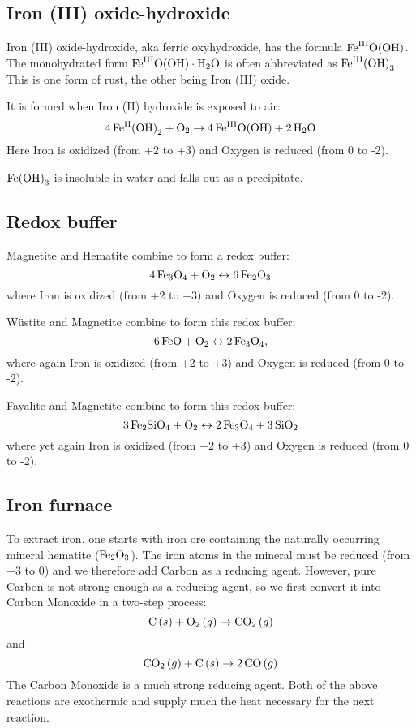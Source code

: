 \documentclass[a4paper,14pt]{extarticle}
\def\H{{\rm H}}
\def\O{{\rm O}}
\def\C{{\rm C}}
\def\Fe{{\rm Fe}}
\def\Si{{\rm Si}}
\def\II{{\rm II}}
\def\III{{\rm III}}
\begin{document}
\subsection{Iron (III) oxide-hydroxide}
Iron (III) oxide-hydroxide, aka ferric oxyhydroxide, has the formula $\Fe^\III\O(\O\H)$. The monohydrated form
$\Fe^\III\O(\O\H)\cdot \H_2\O$ is often abbreviated as $\Fe^\III{(\O\H)}_3$. This is one form of rust, the other being
Iron (III) oxide.

It is formed when Iron (II) hydroxide is exposed to air:
\[
    4 \,\Fe^\II{(\O\H)}_2 + \O_2 \rightarrow 4 \,\Fe^\III\O(\O\H) + 2 \,\H_2\O
\]
Here Iron is oxidized (from +2 to +3) and Oxygen is reduced (from 0 to -2).

$\Fe{(\O\H)}_3$ is insoluble in water and falls out as a precipitate.

\subsection{Redox buffer}
Magnetite and Hematite combine to form a redox buffer:
\[
    4 \,\Fe_3\O_4 + \O_2 \leftrightarrow 6\, \Fe_2\O_3
\]
where Iron is oxidized (from +2 to +3) and Oxygen is reduced (from 0 to -2).

Wüstite and Magnetite combine to form this redox buffer:
\[
    6 \,\Fe\O + \O_2 \leftrightarrow 2\,\Fe_3\O_4,
\]
where again Iron is oxidized (from +2 to +3) and Oxygen is reduced (from 0 to -2).

Fayalite and Magnetite combine to form this redox buffer:
\[
    3 \,\Fe_2\Si\O_4 + \O_2 \leftrightarrow 2 \,\Fe_3\O_4 + 3 \,\Si\O_2
\]
where yet again Iron is oxidized (from +2 to +3) and Oxygen is reduced (from 0 to -2).

\subsection{Iron furnace}
To extract iron, one starts with iron ore containing the naturally occurring mineral hematite ($\Fe_2\O_3$). The iron
atoms in the mineral must be reduced (from +3 to 0) and we therefore add Carbon as a reducing agent. However, pure Carbon is not
strong enough as a reducing agent, so we first convert it into Carbon Monoxide in a two-step process:
\[
    \C\,(s) + \O_2\,(g) \rightarrow \C\O_2\,(g)
\]
and
\[
    \C\O_2\,(g) + \C\,(s) \rightarrow 2\,\C\O\,(g)
\]
The Carbon Monoxide is a much strong reducing agent. Both of the above reactions are exothermic and supply much the heat
necessary for the next reaction.
\end{document}
